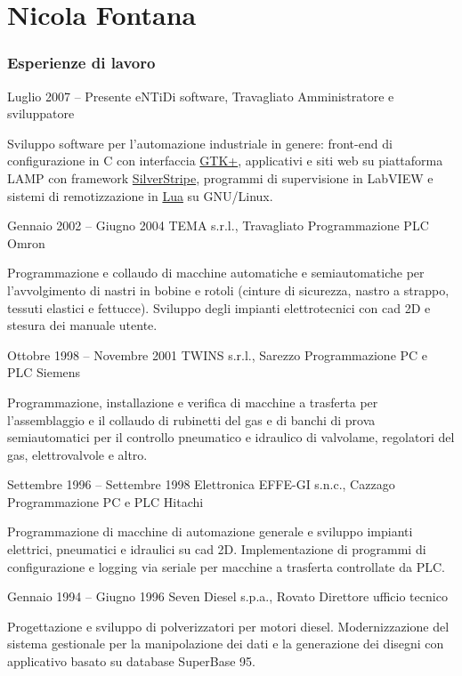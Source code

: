 \documentclass{tccv}
\begin{document}
\part{Nicola Fontana}

%
\begin{minipage}[t]{0.5\linewidth}
\vspace{0pt} %

\section{Esperienze di lavoro}

\begin{eventlist}

\item{Luglio 2007 -- Presente}
     {eNTiDi software, Travagliato}
     {Amministratore e sviluppatore}

Sviluppo software per l'automazione industriale in genere:
front-end di configurazione in C con interfaccia
\href{http://www.gtk.org/}{GTK+}, applicativi e siti web su piattaforma
LAMP con framework \href{http://www.silverstripe.org/}{SilverStripe},
programmi di supervisione in LabVIEW e sistemi di remotizzazione in
\href{http://www.lua.org/}{Lua} su GNU/Linux.

\item{Gennaio 2002 -- Giugno 2004}
     {TEMA s.r.l., Travagliato}
     {Programmazione PLC Omron}

Programmazione e collaudo di macchine automatiche e
semiautomatiche per l'avvolgimento di nastri in bobine e rotoli (cinture
di sicurezza, nastro a strappo, tessuti elastici e fettucce). Sviluppo
degli impianti elettrotecnici con cad 2D e stesura dei manuale
utente.

\item{Ottobre 1998 -- Novembre 2001}
     {TWINS s.r.l., Sarezzo}
     {Programmazione PC e PLC Siemens}

Programmazione, installazione e verifica di macchine a
trasferta per l'assemblaggio e il collaudo di rubinetti del gas e di
banchi di prova semiautomatici per il controllo pneumatico e idraulico
di valvolame, regolatori del gas, elettrovalvole e altro.

\item{Settembre 1996 -- Settembre 1998}
     {Elettronica EFFE-GI s.n.c., Cazzago}
     {Programmazione PC e PLC Hitachi}

Programmazione di macchine di automazione generale e
sviluppo impianti elettrici, pneumatici e idraulici su cad 2D.
Implementazione di programmi di configurazione e logging via seriale per
macchine a trasferta controllate da PLC.

\item{Gennaio 1994 -- Giugno 1996}
     {Seven Diesel s.p.a., Rovato}
     {Direttore ufficio tecnico}

Progettazione e sviluppo di polverizzatori per motori
diesel. Modernizzazione del sistema gestionale per la manipolazione
dei dati e la generazione dei disegni con applicativo basato su
database SuperBase 95.

\end{eventlist}
\end{minipage}
\end{document}
